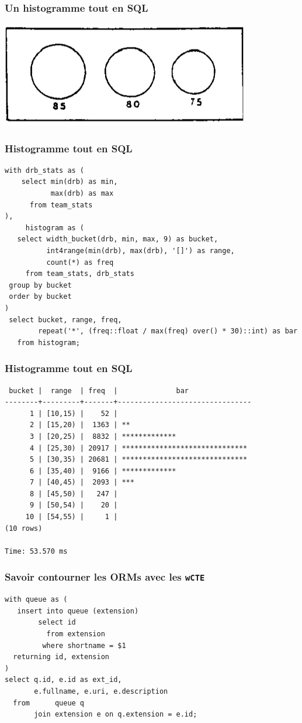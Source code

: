 \documentclass{beamer}
\begin{document}
\begin{frame}
  \frametitle{Un histogramme tout en SQL}

  \begin{center}
    \includegraphics[height=1.8in]{histogram.png}
  \end{center}
\end{frame}

\begin{frame}[fragile]
  \frametitle{Histogramme tout en SQL}
  
  \begin{verbatim}
with drb_stats as (
    select min(drb) as min,
           max(drb) as max
      from team_stats
),
     histogram as (
   select width_bucket(drb, min, max, 9) as bucket,
          int4range(min(drb), max(drb), '[]') as range,
          count(*) as freq
     from team_stats, drb_stats
 group by bucket
 order by bucket
)
 select bucket, range, freq,
        repeat('*', (freq::float / max(freq) over() * 30)::int) as bar
   from histogram;
  \end{verbatim}
\end{frame}

\begin{frame}[fragile]
  \frametitle{Histogramme tout en SQL}
  
  \begin{verbatim}
 bucket |  range  | freq  |              bar               
--------+---------+-------+--------------------------------
      1 | [10,15) |    52 | 
      2 | [15,20) |  1363 | **
      3 | [20,25) |  8832 | *************
      4 | [25,30) | 20917 | ******************************
      5 | [30,35) | 20681 | ******************************
      6 | [35,40) |  9166 | *************
      7 | [40,45) |  2093 | ***
      8 | [45,50) |   247 | 
      9 | [50,54) |    20 | 
     10 | [54,55) |     1 | 
(10 rows)

Time: 53.570 ms
\end{verbatim}
\end{frame}

\begin{frame}[fragile]
  \frametitle{Savoir contourner les ORMs avec les \texttt{wCTE}}
  
  \begin{verbatim}
with queue as (
   insert into queue (extension)
        select id
          from extension
         where shortname = $1
  returning id, extension
)
select q.id, e.id as ext_id,
       e.fullname, e.uri, e.description
  from      queue q
       join extension e on q.extension = e.id;    
  \end{verbatim}
\end{frame}
\end{document}
